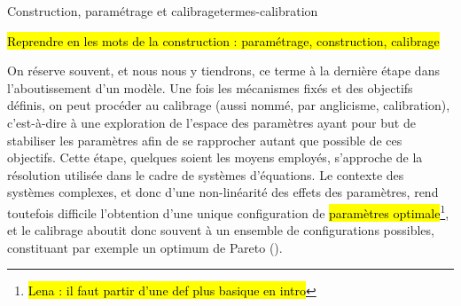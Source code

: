\begin{encadre}{Construction, paramétrage et calibrage}{termes-calibration}
	
	\begin{center}
		\hl{Reprendre en \og les mots de la construction : paramétrage, construction, calibrage}
	\end{center}
	
	\begin{description}[style=nextline]	
		\item[Construction]
		
		\item[Paramétrage]
		
		\item[Calibrage] On réserve souvent, et nous nous y tiendrons, ce terme à la dernière étape dans l'aboutissement d'un modèle.
		Une fois les mécanismes fixés et des objectifs définis, on peut procéder au calibrage (aussi nommé, par anglicisme, \og calibration\fg{}), c'est-à-dire à une exploration de l'espace des paramètres ayant pour but de stabiliser les paramètres afin de se rapprocher autant que possible de ces objectifs.
		Cette étape, quelques soient les moyens employés, s'approche de la résolution utilisée dans le cadre de systèmes d'équations.
		Le contexte des systèmes complexes, et donc d'une non-linéarité des effets des paramètres, rend toutefois difficile l'obtention d'une unique configuration de \hl{paramètres optimale}\footnote{
			\hl{Lena : il faut partir d'une def plus basique en intro}
		}, et le calibrage aboutit donc souvent à un ensemble de configurations possibles, constituant par exemple un optimum de Pareto ().
		
	\end{description}
\end{encadre}


